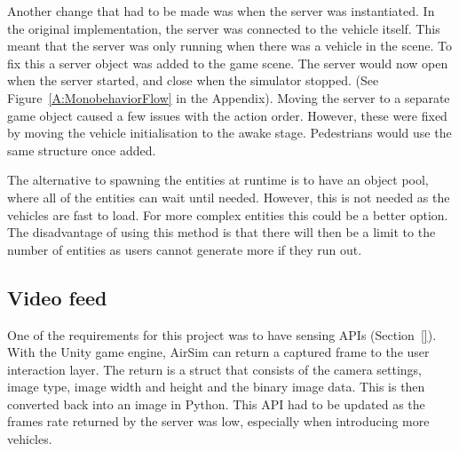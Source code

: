 Another change that had to be made was when the server was instantiated. In the original implementation, the server was connected to the vehicle itself. This meant that the server was only running when there was a vehicle in the scene. To fix this a server object was added to the game scene. The server would now open when the server started, and close when the simulator stopped. (See Figure~\ref{A:MonobehaviorFlow} in the Appendix). Moving the server to a separate game object caused a few issues with the action order. However, these were fixed by moving the vehicle initialisation to the awake stage. Pedestrians would use the same structure once added. 

The alternative to spawning the entities at runtime is to have an object pool, where all of the entities can wait until needed. However, this is not needed as the vehicles are fast to load. For more complex entities this could be a better option. The disadvantage of using this method is that there will then be a limit to the number of entities as users cannot generate more if they run out. 


\subsection{Video feed} \label{06:VideoFeed}
One of the requirements for this project was to have sensing APIs (Section~\ref{}). With the Unity game engine, AirSim can return a captured frame to the user interaction layer. The return is a struct that consists of the camera settings, image type, image width and height and the binary image data. This is then converted back into an image in Python. This API had to be updated as the frames rate returned by the server was low, especially when introducing more vehicles. 

